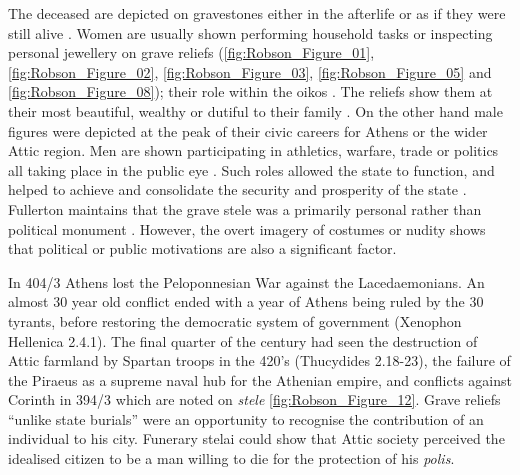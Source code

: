 The deceased are depicted on gravestones either in the afterlife or as if they were still alive \parencite[115]{Boardman1995}.
Women are usually shown performing household tasks or inspecting personal jewellery on grave reliefs (\ref{fig:Robson_Figure_01}, \ref{fig:Robson_Figure_02}, \ref{fig:Robson_Figure_03}, \ref{fig:Robson_Figure_05} and \ref{fig:Robson_Figure_08});
their role within the oikos \parencite[20]{Burton2003}.
The reliefs show them at their most beautiful, wealthy or dutiful to their family \parencite[117]{Sourvinouinwood1995b}.
On the other hand male figures were depicted at the peak of their civic careers for Athens or the wider Attic region. Men are shown participating in athletics, warfare, trade or politics  all taking place in the public eye \parencite[21]{Burton2003}.
Such roles allowed the state to function, and helped to achieve and consolidate the security and prosperity of the state \parencite[27]{Burton2003}.
Fullerton maintains that the grave stele was a primarily personal rather than political monument \parencite[542]{Fullerton2016}. However, the overt imagery of costumes or nudity shows that political or public motivations are also a significant factor.

In 404/3 \BC Athens lost the Peloponnesian War against the Lacedaemonians. An almost 30 year old conflict ended with a year of Athens being ruled by the 30 tyrants, before restoring the democratic system of government (Xenophon Hellenica 2.4.1). The final quarter of the  century \BC had seen the destruction of Attic farmland by Spartan troops in the 420’s \BC (Thucydides 2.18-23), the failure of the Piraeus as a supreme naval hub for the Athenian empire, and conflicts against Corinth in 394/3 \BC which are noted on \textit{stele} \ref{fig:Robson_Figure_12}. Grave reliefs \enquote{unlike state burials} were an opportunity to recognise the contribution of an individual to his city. Funerary stelai could show that Attic society perceived the idealised citizen to be a man willing to die for the protection of his \textit{polis}.

